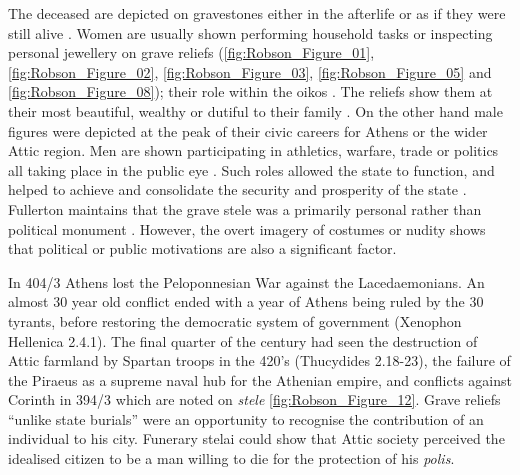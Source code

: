 The deceased are depicted on gravestones either in the afterlife or as if they were still alive \parencite[115]{Boardman1995}.
Women are usually shown performing household tasks or inspecting personal jewellery on grave reliefs (\ref{fig:Robson_Figure_01}, \ref{fig:Robson_Figure_02}, \ref{fig:Robson_Figure_03}, \ref{fig:Robson_Figure_05} and \ref{fig:Robson_Figure_08});
their role within the oikos \parencite[20]{Burton2003}.
The reliefs show them at their most beautiful, wealthy or dutiful to their family \parencite[117]{Sourvinouinwood1995b}.
On the other hand male figures were depicted at the peak of their civic careers for Athens or the wider Attic region. Men are shown participating in athletics, warfare, trade or politics  all taking place in the public eye \parencite[21]{Burton2003}.
Such roles allowed the state to function, and helped to achieve and consolidate the security and prosperity of the state \parencite[27]{Burton2003}.
Fullerton maintains that the grave stele was a primarily personal rather than political monument \parencite[542]{Fullerton2016}. However, the overt imagery of costumes or nudity shows that political or public motivations are also a significant factor.

In 404/3 \BC Athens lost the Peloponnesian War against the Lacedaemonians. An almost 30 year old conflict ended with a year of Athens being ruled by the 30 tyrants, before restoring the democratic system of government (Xenophon Hellenica 2.4.1). The final quarter of the  century \BC had seen the destruction of Attic farmland by Spartan troops in the 420’s \BC (Thucydides 2.18-23), the failure of the Piraeus as a supreme naval hub for the Athenian empire, and conflicts against Corinth in 394/3 \BC which are noted on \textit{stele} \ref{fig:Robson_Figure_12}. Grave reliefs \enquote{unlike state burials} were an opportunity to recognise the contribution of an individual to his city. Funerary stelai could show that Attic society perceived the idealised citizen to be a man willing to die for the protection of his \textit{polis}.

